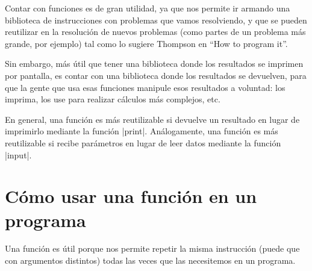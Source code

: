 Contar con funciones es de gran utilidad, ya que nos permite ir armando una
biblioteca de instrucciones con problemas que vamos resolviendo, y que se
pueden reutilizar en la resolución de nuevos problemas (como partes de un
problema más grande, por ejemplo) tal como lo sugiere Thompson en ``How to
program it''.

Sin embargo, más útil que tener una biblioteca donde los resultados
se imprimen por pantalla, es contar con una biblioteca donde los
resultados se devuelven, para que la gente que usa esas funciones manipule
esos resultados a voluntad: los imprima, los use para realizar cálculos
más complejos, etc.

\begin{observacion}
En general, una función es más reutilizable si devuelve un resultado en
lugar de imprimirlo mediante la función |print|. Análogamente, una función es
más reutilizable si recibe parámetros en lugar de leer datos mediante la
función |input|.
\end{observacion}





\section{Cómo usar una función en un programa}

Una función es útil porque nos permite repetir la misma
instrucción (puede que con argumentos distintos) todas las veces
que las necesitemos en un programa.

